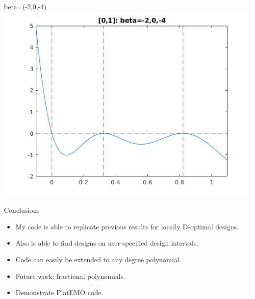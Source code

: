 \documentclass[11pt]{beamer}
\begin{document}
\begin{frame}{beta=(-2,0,-4)}
\includegraphics[scale=0.18]{quadplots/01_4.jpg}
\end{frame}

\begin{frame}{Conclusions}
\begin{itemize}
\item My code is able to replicate previous results for locally D-optimal designs.
\item Also is able to find designs on user-specified  design intervals.
\item Code can easily be extended to any degree polynomial.
\item Future work: fractional polynomials.
\item Demonstrate PlatEMO code.
\end{itemize}
\end{frame}
\end{document}
